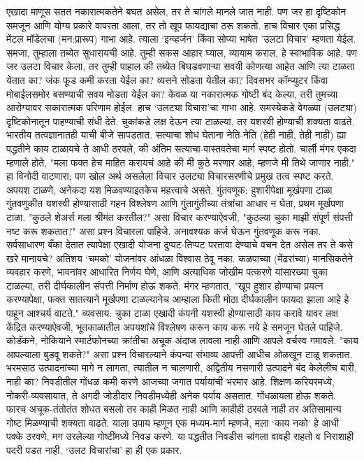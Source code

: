एखादा माणूस सतत नकारात्मकतेने बघत असेल, तर ते चांगले मानले जात नाही. पण जर हा दृष्टिकोन समजून आणि योग्य प्रकारे वापरता आला, तर तो खूप फायद्याचा ठरू शकतो. हाच विचार एका प्रसिद्ध मेंटल मॉडेलचा (मन:प्रारूप) गाभा आहे. त्याला ‘इन्व्हर्जन’ किंवा सोप्या भाषेत 'उलटा विचार' म्हणता येईल.  समजा, तुम्हाला तब्येत सुधारायची आहे. तुम्ही सकस आहार घ्याल, व्यायाम कराल, हे स्वाभाविक आहे. पण जर उलटा विचार केला, तर तुम्ही पाहाल की तब्येत बिघडवणाऱ्या सवयी कोणत्या आहेत आणि त्या टाळता येतात का? जंक फूड कमी करता येईल का? व्यसने सोडता येतील का? दिवसभर कॉम्प्युटर किंवा मोबाईलसमोर बसण्याची सवय मोडता येईल का? केवळ या नकारात्मक गोष्टी बंद केल्या, तरी तुमच्या आरोग्यावर सकारात्मक परिणाम होईल. हाच ‘उलट्या विचारा’चा गाभा आहे. समस्येकडे वेगळ्या (उलट्या) दृष्टिकोनातून पाहण्याची संधी देते. चुकांकडे लक्ष देऊन त्या टाळल्या, तर यशस्वी होण्याची शक्यता वाढते.  भारतीय तत्वज्ञानातही याची बीजे सापडतात. सत्याचा शोध घेताना नेति-नेति (हेही नाही, तेही नाही) ह्या पद्धतीने काय टाळायचे ते आधी ठरवले, की अंतिम सत्याचा-वास्तवतेचा मार्ग स्पष्ट होतो.  चार्ली मंगर एकदा म्हणाले होते, "मला फक्त हेच माहित करायचं आहे की मी कुठे मरणार आहे, म्हणजे मी तिथे जाणार नाही." हा विनोदी वाटणारा; पण खोल अर्थ असलेला विचार उलट्या विचारसरणीचे प्रमुख तत्व स्पष्ट करते. अपयश टाळणे, अनेकदा यश मिळवण्याइतकेच महत्त्वाचे असते.  
गुंतवणूक: हुशारीपेक्षा मूर्खपणा टाळा
गुंतवणुकीत यशस्वी होण्यासाठी गहन विश्लेषण आणि गुंतागुंतीच्या तंत्रांचा आधार न घेता, प्रथम मूर्खपणा टाळा. "कुठले शेअर्स मला श्रीमंत करतील?" असा विचार करण्याऐवजी, "कुठल्या चुका माझी संपूर्ण संपत्ती नष्ट करू शकतात?" असा प्रश्न विचारला पाहिजे. अनावश्यक कर्ज घेऊन गुंतवणूक करू नका. सर्वसाधारण बँका देतात त्यापेक्षा एखादी योजना दुप्पट-तिप्पट परतावा देण्याचे वचन देत असेल तर ते कसे खरे मानायचे? अतिशय ‘चमको’ योजनांवर आंधळा विश्वास ठेवू नका. कळपाच्या (मेंढरांच्या) मानसिकतेने व्यवहार करणे, भावनांवर आधारित निर्णय घेणे, आणि अत्याधिक जोखीम पत्करणे यांसारख्या चुका टाळल्या, तरी दीर्घकालीन संपत्ती निर्माण होऊ शकते.  मंगर म्हणतात, "खूप हुशार होण्याचा प्रयत्न करण्यापेक्षा, फक्त सातत्याने मूर्खपणा टाळल्यानेच आम्हाला किती मोठा दीर्घकालीन फायदा झाला आहे हे पाहून आश्चर्य वाटते."
व्यवसाय: चुका टाळा  
एखादी कंपनी यशस्वी होण्यासाठी काय करावे यावर लक्ष केंद्रित करण्याऐवजी, भूतकाळातील अपयशांचे विश्लेषण करून काय करू नये हे समजून घेतले पाहिजे. कोडॅकने, नोकियाने स्मार्टफोनच्या क्रांतीचा अचूक अंदाज लावला नाही आणि आपले वर्चस्व गमावले. "काय आपल्याला बुडवू शकते?" असा प्रश्न विचारल्याने कंपन्या संभाव्य आपत्ती आधीच ओळखून टाळू शकतात. भरमसाठ उत्पादनांच्या मागे न लागता, त्यातील न चालणारी, अद्वितीय नसणारी उत्पादने बंद केलेलीच बारी, नाही का?
निवडीतील गोंधळ कमी करणे  
आजच्या जगात पर्यायांची भरमार आहे. शिक्षण-करियरमध्ये, नोकरी-व्यवसायात, ते अगदी जोडीदार निवडीमध्येही अनेक पर्याय असतात. गोंधळायला होऊ शकते. फारच अचूक-तंतोतंत शोधत बसलो तर काही मिळत नाही आणि काहीही ठरवले नाही तर अतिसामान्य गोष्ट मिळण्याची शक्यता वाढते. याला उपाय म्हणून एक मध्यम-मार्ग म्हणजे, मला ‘काय नको’ हे आधी पक्के ठरवणे, मग उरलेल्या गोष्टींमध्ये निवड करणे. या पद्धतीत निवडीस चांगला वावही राहतो व निराशाही पदरी पडत नाही. ‘उलट विचारांचा’ हा ही एक प्रकार. 

